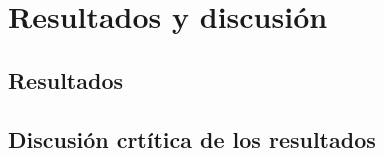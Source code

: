 \chapter{Resultados y discusión}

\section{Resultados}

\section{Discusión crtítica de los resultados}

